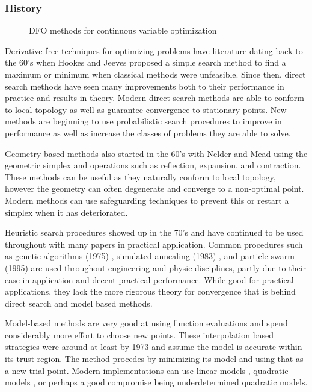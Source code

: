 \subsubsection*{History}
\begin{figure}
\centering

\caption{DFO methods for continuous variable optimization}
\end{figure}
Derivative-free techniques for optimizing problems have literature dating back to the 60's when Hookes and Jeeves \cite{hooke_1961} proposed a simple search method to find a maximum or minimum when classical methods were unfeasible.  Since then, direct search methods have seen many improvements both to their performance in practice and results in theory.  Modern direct search methods are able to conform to local topology as well as guarantee convergence to stationary points.  New methods are beginning to use probabilistic search procedures to improve in performance as well as increase the classes of problems they are able to solve.

Geometry based methods also started in the 60's with Nelder and Mead \cite{nelder_1965} using the geometric simplex and operations such as reflection, expansion, and contraction.  These methods can be useful as they naturally conform to local topology, however the geometry can often degenerate and converge to a non-optimal point.  Modern methods can use safeguarding techniques to prevent this or restart a simplex when it has deteriorated.  

Heuristic search procedures showed up in the 70's and have continued to be used throughout with many papers in practical application.  Common procedures such as genetic algorithms (1975) \cite{holland_1975}, simulated annealing (1983) \cite{kirkpatrick_1983}, and particle swarm (1995) \cite{eberhart_1995} \cite{kennedy_1995} are used throughout engineering and physic disciplines, partly due to their ease in application and decent practical performance.  While good for practical applications, they lack the more rigorous theory for convergence that is behind direct search and model based methods.

Model-based methods are very good at using function evaluations and spend considerably more effort to choose new points.  These interpolation based strategies were around at least by 1973 \cite{winfield_1973} and assume the model is accurate within its trust-region.  The method procedes by minimizing its model and using that as a new trial point.  Modern implementations can use linear models \cite{powell_1994}, quadratic models \cite{powell_2002}, or perhaps a good compromise being underdetermined quadratic models.

